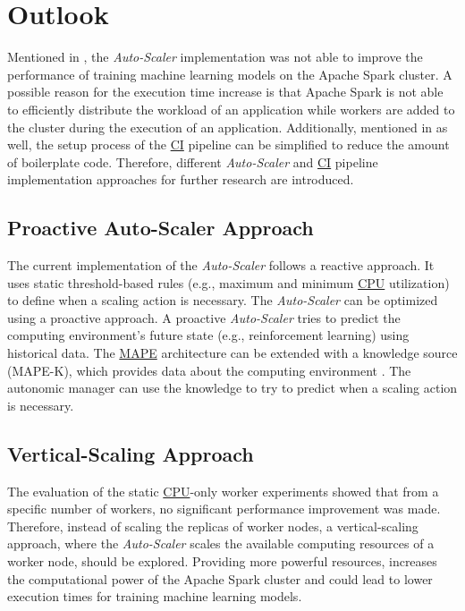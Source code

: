 \section{Outlook}
Mentioned in , the \textit{Auto-Scaler} implementation was not able to improve the performance of training machine learning models on the Apache Spark cluster.
A possible reason for the execution time increase is that Apache Spark is not able to efficiently distribute the workload of an application while workers are added to the cluster during the execution of an application.
Additionally, mentioned in  as well, the setup process of the \hyperlink{abbr:ci}{CI} pipeline can be simplified to reduce the amount of boilerplate code.
Therefore, different \textit{Auto-Scaler} and \hyperlink{abbr:ci}{CI} pipeline implementation approaches for further research are introduced.



\subsection{Proactive Auto-Scaler Approach}
The current implementation of the \textit{Auto-Scaler} follows a reactive approach. It uses static threshold-based rules (e.g., maximum and minimum \hyperlink{abbr:cpu}{CPU} utilization) to define when a scaling action is necessary.
The \textit{Auto-Scaler} can be optimized using a proactive approach. A proactive \textit{Auto-Scaler} tries to predict the computing environment's future state (e.g., reinforcement learning) using historical data.
The \hyperlink{abbr:mape}{MAPE} architecture can be extended with a knowledge source (MAPE-K), which provides data about the computing environment \cite{Sinreich2006AnAB}. The autonomic manager can use the knowledge to try to predict when a scaling action is necessary.


\subsection{Vertical-Scaling Approach}
The evaluation of the static \hyperlink{abbr:cpu}{CPU}-only worker experiments showed that from a specific number of workers, no significant performance improvement was made.
Therefore, instead of scaling the replicas of worker nodes, a vertical-scaling approach, where the \textit{Auto-Scaler} scales the available computing resources of a worker node, should be explored.
Providing more powerful resources, increases the computational power of the Apache Spark cluster and could lead to lower execution times for training machine learning models.


